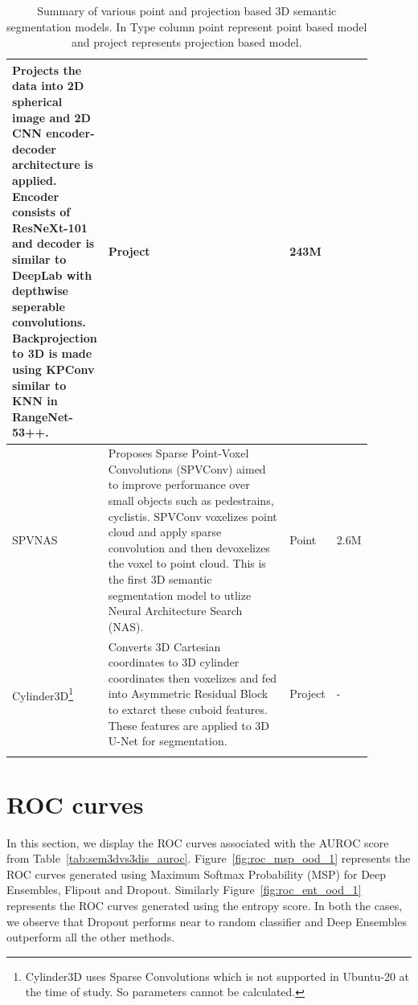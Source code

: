 \begin{longtable}{|p{0.15\linewidth} | p{0.59\linewidth}| p{0.06\linewidth} |p{0.09\linewidth}|}
            Projects the data into 2D spherical image and 2D CNN encoder-decoder architecture is applied.
            Encoder consists of ResNeXt-101 and decoder is similar to DeepLab with depthwise seperable convolutions.
            Backprojection to 3D is made using KPConv similar to KNN in RangeNet-53++.
            & Project & 243M \\
            \hline
            SPVNAS\cite{spvnas} &
            Proposes Sparse Point-Voxel Convolutions (SPVConv) aimed to improve performance over small objects such as pedestrains, cyclistis.
            SPVConv voxelizes point cloud and apply sparse convolution and then devoxelizes the voxel to point cloud.
            This is the first 3D semantic segmentation model to utlize Neural Architecture Search (NAS).
            & Point & 2.6M \\
            \hline
            Cylinder3D\cite{zhu2020cylindrical}\footnote{Cylinder3D uses Sparse Convolutions which is not supported in Ubuntu-20 at the time of study. So parameters cannot be calculated.} &
            Converts 3D Cartesian coordinates to 3D cylinder coordinates then voxelizes and fed into Asymmetric Residual Block to extarct these cuboid features.
            These features are applied to 3D U-Net for segmentation.
            & Project & - \\
            \hline
            \caption{Summary of various point and projection based 3D semantic segmentation models. In Type column point represent point based model and project represents projection based model.}
            \label{tab:model_relatedwork}
    \end{longtable}
    
    \section{ROC curves}
    \label{sec:app_roc_curves}
    In this section, we display the ROC curves associated with the AUROC score from Table~\ref{tab:sem3dvs3dis_auroc}.
    Figure~\ref{fig:roc_msp_ood_1} represents the ROC curves generated using Maximum Softmax Probability (MSP) for Deep Ensembles, Flipout and Dropout.
    Similarly Figure~\ref{fig:roc_ent_ood_1} represents the ROC curves generated using the entropy score.
    In both the cases, we observe that Dropout performs near to random classifier and Deep Ensembles outperform all the other methods.

